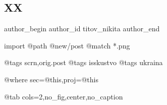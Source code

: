  
 
 
 
 
 
\subsection{XX}
\label{sec:18_11_2022.fb.titov_nikita.1.xx}
 
\ifcmt
 author_begin
   author_id titov_nikita
 author_end
\fi

\ifcmt
  import
    @path @new/post
    @match *.png
  
    @tags scrn,orig.post
    @tags isskustvo
    @tags ukraina

    @where sec=@this,proj=@this
  
    @tab cols=2,no_fig,center,no_caption
\fi
